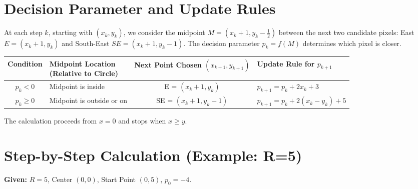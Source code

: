 \documentclass[12pt, a4paper]{article}
\begin{document}
\section{Decision Parameter and Update Rules}
At each step $k$, starting with $(x_k, y_k)$, we consider the midpoint $M = (x_k+1, y_k - \frac{1}{2})$ between the next two candidate pixels: East $E = (x_k+1, y_k)$ and South-East $SE = (x_k+1, y_k-1)$. The decision parameter $p_k = f(M)$ determines which pixel is closer.

\begin{center}
\label{tab:midpoint_update_rules}
\begin{tabular}{@{}c l c l@{}}
\toprule
\textbf{Condition} & \makecell[l]{\textbf{Midpoint Location}\\\textbf{(Relative to Circle)}} & \makecell[c]{\textbf{Next Point Chosen}\\\textbf{$(x_{k+1}, y_{k+1})$}} & \makecell[l]{\textbf{Update Rule}\\\textbf{for } $p_{k+1}$} \\
\midrule
$p_k < 0$ & Midpoint is inside & E = $(x_k+1, y_k)$ & $p_{k+1} = p_k + 2x_k + 3$ \\
\midrule
$p_k \geq 0$ & Midpoint is outside or on & SE = $(x_k+1, y_k-1)$ & $p_{k+1} = p_k + 2(x_k - y_k) + 5$ \\
\bottomrule
\end{tabular}
\end{center}
The calculation proceeds from $x=0$ and stops when $x \geq y$.

\section{Step-by-Step Calculation (Example: R=5)}
\textbf{Given:} $R = 5$, Center $(0, 0)$, Start Point $(0, 5)$, $p_0 = -4$.
\end{document}
